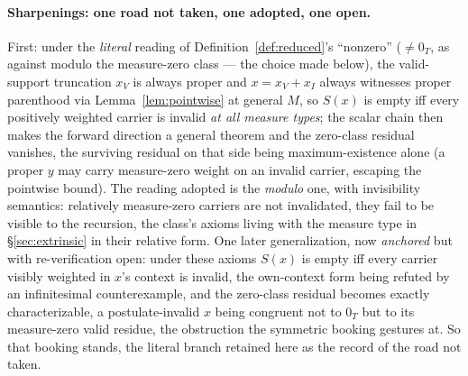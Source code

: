 \paragraph{Sharpenings: one road not taken, one adopted, one open.} First: under the \emph{literal} reading of Definition~\ref{def:reduced}'s ``nonzero'' ($\neq 0_T$, as against modulo the measure-zero class --- the choice made below), the valid-support truncation $x_V$ is always proper and $x = x_V + x_I$ always witnesses proper parenthood via Lemma~\ref{lem:pointwise} at general $M$, so $S(x)$ is empty iff every positively weighted carrier is invalid \emph{at all measure types}; the scalar chain then makes the forward direction a general theorem and the zero-class residual vanishes, the surviving residual on that side being maximum-existence alone (a proper $y$ may carry measure-zero weight on an invalid carrier, escaping the pointwise bound). The reading adopted is the \emph{modulo} one, with invisibility semantics: relatively measure-zero carriers are not invalidated, they fail to be visible to the recursion, the class's axioms living with the measure type in §\ref{sec:extrinsic} in their relative form. One later generalization, now \emph{anchored} but with re-verification open: under these axioms $S(x)$ is empty iff every carrier visibly weighted in $x$'s context is invalid, the own-context form being refuted by an infinitesimal counterexample, and the zero-class residual becomes exactly characterizable, a postulate-invalid $x$ being congruent not to $0_T$ but to its measure-zero valid residue, the obstruction the symmetric booking gestures at. So that booking stands, the literal branch retained here as the record of the road not taken.
